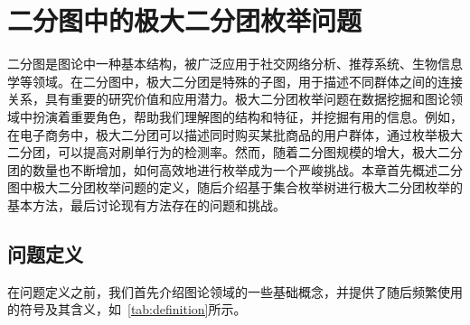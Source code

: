 \chapter{二分图中的极大二分团枚举问题}
\label{ch:intro}

二分图是图论中一种基本结构，被广泛应用于社交网络分析、推荐系统、生物信息学等领域。在二分图中，极大二分团是特殊的子图，用于描述不同群体之间的连接关系，具有重要的研究价值和应用潜力。极大二分团枚举问题在数据挖掘和图论领域中扮演着重要角色，帮助我们理解图的结构和特征，并挖掘有用的信息。例如，在电子商务中，极大二分团可以描述同时购买某批商品的用户群体，通过枚举极大二分团，可以提高对刷单行为的检测率。然而，随着二分图规模的增大，极大二分团的数量也不断增加，如何高效地进行枚举成为一个严峻挑战。本章首先概述二分图中极大二分团枚举问题的定义，随后介绍基于集合枚举树进行极大二分团枚举的基本方法，最后讨论现有方法存在的问题和挑战。


\section{问题定义}

在问题定义之前，我们首先介绍图论领域的一些基础概念，并提供了随后频繁使用的符号及其含义，如~\autoref{tab:definition}所示。

